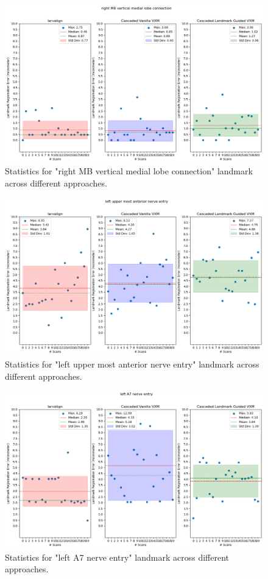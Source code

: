 \documentclass{report}
\begin{document}
\begin{figure}[h!]
	\centering
	\includegraphics[width=0.7\columnwidth]{resources/chapter5_fresh/output/right MB vertical medial lobe connection.png}
	\caption{Statistics for "right MB vertical medial lobe connection" landmark across different approaches.}
	\label{fig:landmark20}
\end{figure}

\begin{figure}[h!]
	\centering
	\includegraphics[width=0.7\columnwidth]{resources/chapter5_fresh/output/left upper most anterior nerve entry.png}
	\caption{Statistics for "left upper most anterior nerve entry" landmark across different approaches.}
	\label{fig:landmark21}
\end{figure}

\begin{figure}[h!]
	\centering
	\includegraphics[width=0.7\columnwidth]{resources/chapter5_fresh/output/left A7 nerve entry.png}
	\caption{Statistics for "left A7 nerve entry" landmark across different approaches.}
	\label{fig:landmark22}
\end{figure}
\end{document}
